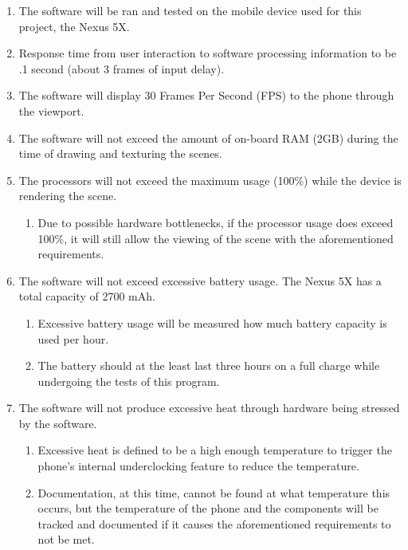 \documentclass[letterpaper,10pt,draftclsnofoot,onecolumn,compsoc]{IEEEtran}
\begin{document}
\begin{singlespace}
\begin{singlespace}
\begin{enumerate}[labelsep=2em,leftmargin=.5in]
    \item The software will be ran and tested on the mobile device used for this project, the Nexus 5X.
    \item Response time from user interaction to software processing information to be .1 second (about 3 frames of input delay).
    \item The software will display 30 Frames Per Second (FPS) to the phone through the viewport.
    \item The software will not exceed the amount of on-board RAM (2GB) during the time of drawing and texturing the scenes.
    \item The processors will not exceed the maximum usage (100\%) while the device is rendering the scene.
    \begin{enumerate}[leftmargin=*,labelindent=0pt]
        \item Due to possible hardware bottlenecks, if the processor usage does exceed 100\%, it will still allow the viewing of the scene with the aforementioned requirements.
    \end{enumerate}
    \item The software will not exceed excessive battery usage. The Nexus 5X has a total capacity of 2700 mAh.
    \begin{enumerate}[leftmargin=*,labelindent=0pt]
        \item Excessive battery usage will be measured how much battery capacity is used per hour.
        \item The battery should at the least last three hours on a full charge while undergoing the tests of this program.
    \end{enumerate}
    \item The software will not produce excessive heat through hardware being stressed by the software.
    \begin{enumerate}[leftmargin=*,labelindent=0pt]
        \item Excessive heat is defined to be a high enough temperature to trigger the phone's internal underclocking feature to reduce the temperature.
        \item Documentation, at this time, cannot be found at what temperature this occurs, but the temperature of the phone and the components will be tracked and documented if it causes the aforementioned requirements to not be met.
    \end{enumerate}
\end{enumerate}
\end{singlespace}


\end{singlespace}
\end{document}
